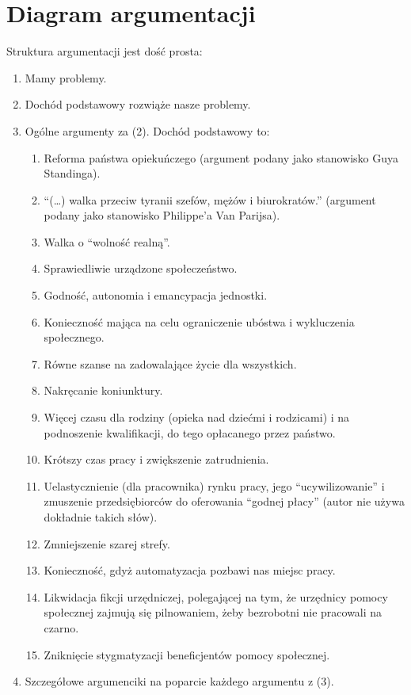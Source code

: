 \documentclass[11pt]{article}
\begin{document}
	\section{Diagram argumentacji}
		\par Struktura argumentacji jest dość prosta:
		\begin{enumerate}
			\item Mamy problemy.
			\item Dochód podstawowy rozwiąże nasze problemy.
			\item Ogólne argumenty za (2). Dochód podstawowy to:
			\begin{enumerate}
				\item Reforma państwa opiekuńczego (argument podany jako stanowisko Guya Standinga).
				\item ``(\dots) walka przeciw tyranii szefów, mężów i biurokratów.'' (argument podany jako stanowisko Philippe'a Van Parijsa).
				\item Walka o ``wolność realną''.
				\item Sprawiedliwie urządzone społeczeństwo.
				\item Godność, autonomia i emancypacja jednostki.
				\item Konieczność mająca na celu ograniczenie ubóstwa i wykluczenia społecznego.
				\item Równe szanse na zadowalające życie dla wszystkich.
				\item Nakręcanie koniunktury.
				\item Więcej czasu dla rodziny (opieka nad dziećmi i rodzicami) i na podnoszenie kwalifikacji, do tego opłacanego przez państwo.
				\item Krótszy czas pracy i zwiększenie zatrudnienia.
				\item Uelastycznienie (dla pracownika) rynku pracy, jego ``ucywilizowanie'' i zmuszenie przedsiębiorców do oferowania ``godnej płacy'' (autor nie używa dokładnie takich słów).
				\item Zmniejszenie szarej strefy.
				\item Konieczność, gdyż automatyzacja pozbawi nas miejsc pracy.
				\item Likwidacja fikcji urzędniczej, polegającej na tym, że urzędnicy pomocy społecznej zajmują się pilnowaniem, żeby bezrobotni nie pracowali na czarno.
				\item Zniknięcie stygmatyzacji beneficjentów pomocy społecznej.
			\end{enumerate}
			\item Szczegółowe argumenciki na poparcie każdego argumentu z (3).

\end{enumerate}
\end{document}
